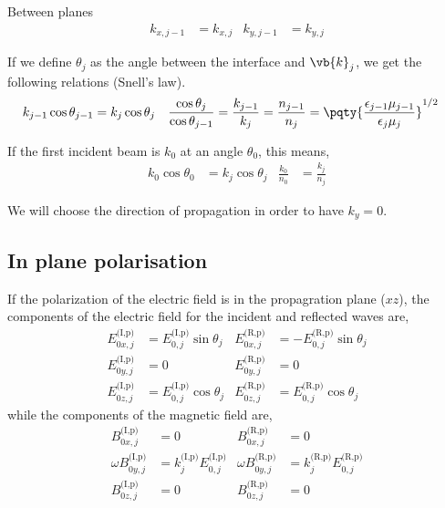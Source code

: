 Between planes
\begin{align*}
	k_{x,j-1} &= k_{x,j} & k_{y,j-1} &= k_{y,j}
\end{align*}

If we define $\theta_j$ as the angle between the interface and $\vb{k}_j$, we get the following relations (Snell's law).
\begin{align*}
	k_{j-1}\cos\theta_{j-1} &= k_{j}\cos\theta_{j} & \frac{\cos\theta_j}{\cos\theta_{j-1}} &= \frac{k_{j-1}}{k_j} = \frac{n_{j-1}}{n_j} = \pqty{\frac{\epsilon_{j-1}\mu_{j-1}}{\epsilon_j\mu_j}}^{1/2}
\end{align*}

If the first incident beam is $k_0$ at an angle $\theta_0$, this means,
\begin{align*}
	k_{0}\cos\theta_{0} &= k_{j}\cos\theta_{j} & \frac{k_0}{n_0} &= \frac{k_j}{n_j}
\end{align*}

We will choose the direction of propagation in order to have $k_y = 0$.



\subsection{In plane polarisation} %
\label{sub:in_plane_polarisation}

If the polarization of the electric field is in the propagration plane ($xz$), the components of the electric field for the incident and reflected waves are,
\begin{align*}
	E^{\text{(I,p)}}_{0x,j} &= E^{\text{(I,p)}}_{0,j}\sin\theta_j & E^{\text{(R,p)}}_{0x,j} &= -E^{\text{(R,p)}}_{0,j}\sin\theta_j \\
	E^{\text{(I,p)}}_{0y,j} &= 0 & E^{\text{(R,p)}}_{0y,j} &= 0 \\
	E^{\text{(I,p)}}_{0z,j} &= E^{\text{(I,p)}}_{0,j}\cos\theta_j & E^{\text{(R,p)}}_{0z,j} &= E^{\text{(R,p)}}_{0,j}\cos\theta_j
\end{align*} while the components of the magnetic field are,
\begin{align*}
	B^{\text{(I,p)}}_{0x,j} &= 0 & B^{\text{(R,p)}}_{0x,j} &= 0 \\
	\omega B^{\text{(I,p)}}_{0y,j} &= k^{\text{(I,p)}}_jE^{\text{(I,p)}}_{0,j} & \omega B^{\text{(R,p)}}_{0y,j} &= k^{\text{(R,p)}}_jE^{\text{(R,p)}}_{0,j} \\
	B^{\text{(I,p)}}_{0z,j} &= 0 & B^{\text{(R,p)}}_{0z,j} &= 0 \\
\end{align*}

